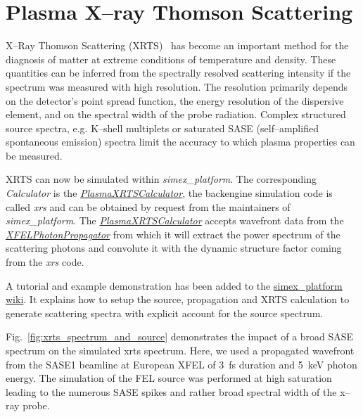 \documentclass[12pt]{scrartcl}
\begin{document}
\section{Plasma X--ray Thomson Scattering\label{sec:xrts}}
%
X--Ray Thomson Scattering (XRTS)~\cite{Glenzer2009,Fortmann2009d} has
become an important method for the diagnosis of matter at extreme conditions of
temperature and density. These quantities can be inferred from the spectrally
resolved scattering intensity if the spectrum was measured with high resolution.
The resolution primarily depends on the detector's point spread function, the
energy resolution of the dispersive element, and on the spectral width of
the probe radiation. Complex structured source spectra, e.g. K--shell multiplets
\cite{Lee2009a} or saturated SASE (self--amplified spontaneous emission) spectra
limit the accuracy to which plasma properties can be measured.

XRTS can now be simulated within \textit{simex\_platform}. The corresponding
\textit{Calculator} is the
\href{https://eucall-software.github.io/simex_platform/#SimEx.Calculators.PlasmaXRTSCalculator.PlasmaXRTSCalculator}{\textit{PlasmaXRTSCalculator}},
the backengine simulation code is called \textit{xrs} and can be obtained by
request from the maintainers of \textit{simex\_platform}. The
\href{https://eucall-software.github.io/simex_platform/#SimEx.Calculators.PlasmaXRTSCalculator.PlasmaXRTSCalculator}{\textit{PlasmaXRTSCalculator}}
accepts wavefront data from the
\href{https://eucall-software.github.io/simex_platform/#SimEx.Calculators.XFELPhotonPropagator.XFELPhotonPropagator}{\textit{XFELPhotonPropagator}}
from which it will extract the power spectrum of the scattering photons and
convolute it with the dynamic structure factor coming from the \textit{xrs}
code.

A tutorial and example demonstration has been added to the
\href{https://github.com/eucall-software/simex_platform/wiki/XRTS-Tutoria}{simex\_platform
wiki}. It explains how to setup the source, propagation and XRTS calculation
to generate scattering spectra with explicit account for the source spectrum.

Fig.~\ref{fig:xrts_spectrum_and_source} demonstrates the impact of a broad SASE
spectrum on the simulated \gls{xrts} spectrum. Here, we used a propagated
wavefront from the SASE1 beamline at European XFEL of \SI{3}{\femto\second}
duration and \SI{5}{\kilo\electronvolt} photon energy. The simulation of the FEL
source was performed at high saturation leading to the numerous SASE spikes and
rather broad spectral width of the x--ray probe.
\end{document}
